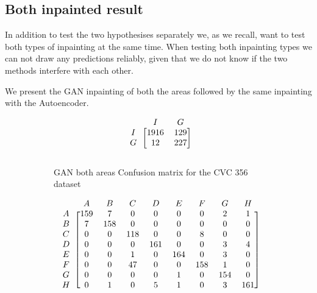 \FloatBarrier
\subsection{Both inpainted result}

In addition to test the two hypothesises separately we, as we recall, want to test both types of inpainting at the same time.
When testing both inpainting types we can not draw any predictions reliably, given that we do not know if the two methods interfere with each other. 

We present the GAN inpainting of both the areas followed by the same inpainting with the Autoencoder.


\begin{figure}[h]
\myfontsize
\caption*{\footnotesize \textmd{ \textbf{A}:{dyed-lifted-polyps} , \textbf{B}:{dyed-resection-margins} , \textbf{C}:{esophagitis} , \textbf{D}:{normal-cecum} , \textbf{E}:{normal-pylorus} , \textbf{F}:{normal-z-line} , \textbf{G}:{polyps} , \textbf{H}:{ulcerative-colitis} , \textbf{I}:{non-polyp}}}

\begin{subfigure}[b]{0.25\textwidth}
     
\[
\begin{blockarray}{ccc}
& I & G  \\
\begin{block}{c[cc]}
        I&1916 &  129\\
        G& 12 &  227\\
\end{block}
\end{blockarray}
 \]         

\caption{GAN both areas Confusion matrix for the CVC 356 dataset}
\label{mat:cvc356_CM_DN121_GAN_BOTH}
\end{subfigure}
\begin{subfigure}[b]{0.49\textwidth}  
\scriptsize     
\[
\begin{blockarray}{ccccccccc}
& A & B & C & D & E & F & G & H \\
\begin{block}{c[cccccccc]}
A&159 & 7 & 0 & 0 & 0 & 0 & 2 & 1\\
B&  7 & 158 & 0 & 0 & 0 & 0 & 0 & 0\\
C&  0 & 0 & 118 & 0 & 0 & 8 & 0 & 0\\
D&  0 & 0 & 0 & 161 & 0 & 0 & 3 & 4\\
E&  0 & 0 & 1 & 0 & 164 & 0 & 3 & 0\\
F&  0 & 0 & 47 & 0 & 0 & 158 & 1 & 0\\
G&  0 & 0 & 0 & 0 & 1 & 0 & 154 & 0\\
H&  0 & 1 & 0 & 5 & 1 & 0 & 3 & 161\\
\end{block}
\end{blockarray}
 \]        
        

\end{subfigure}
\end{figure}
